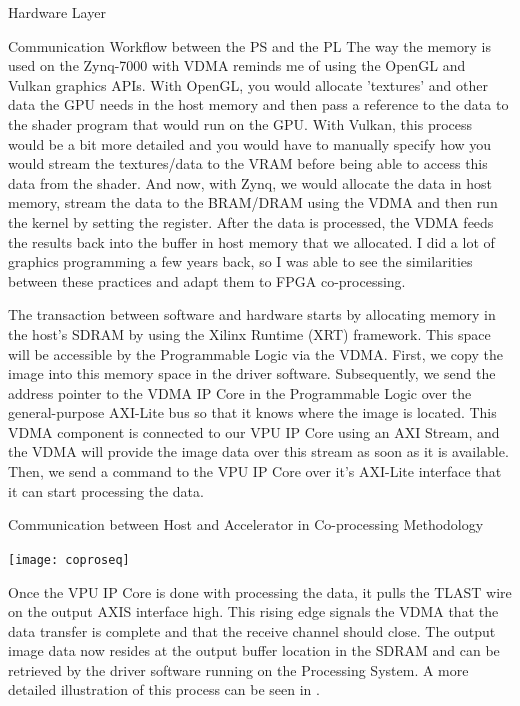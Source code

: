 \documentclass{matthijs}
\begin{document}
\begin{hoofdstuk}{Hardware Layer}
\begin{paragraaf}{Communication Workflow between the PS and the PL}
			The way the memory is used on the Zynq-7000 with VDMA reminds me of using the OpenGL and Vulkan graphics APIs.
			With OpenGL, you would allocate 'textures' and other data the GPU needs in the host memory and then pass a reference to the data to the shader program that would run on the GPU.
			With Vulkan, this process would be a bit more detailed and you would have to manually specify how you would stream the textures/data to the VRAM before being able to access this data from the shader.
			And now, with Zynq, we would allocate the data in host memory, stream the data to the BRAM/DRAM using the VDMA and then run the kernel by setting the register.
			After the data is processed, the VDMA feeds the results back into the buffer in host memory that we allocated.
			I did a lot of graphics programming a few years back, so I was able to see the similarities between these practices and adapt them to FPGA co-processing.
			
			\bigskip

			The transaction between software and hardware starts by allocating memory in the host's SDRAM by using the Xilinx Runtime (XRT) framework.
			This space will be accessible by the Programmable Logic via the VDMA.
			First, we copy the image into this memory space in the driver software.
			Subsequently, we send the address pointer to the VDMA IP Core in the Programmable Logic over the general-purpose AXI-Lite bus so that it knows where the image is located.
			This VDMA component is connected to our VPU IP Core using an AXI Stream, and the VDMA will provide the image data over this stream as soon as it is available.
			Then, we send a command to the VPU IP Core over it's AXI-Lite interface that it can start processing the data.

			\vspace{-0.6ex}
			\begin{figuur}{Communication between Host and Accelerator in Co-processing Methodology}
				\singlespacing
				\begin{adjustbox}{width=\textwidth,center}
					\texttt{[image: coproseq]}
				\end{adjustbox}
				\onehalfspacing
				\vspace{-3.9ex}
			\end{figuur}
			\vspace{-0.2ex}

			Once the VPU IP Core is done with processing the data, it pulls the TLAST wire on the output AXIS interface high.
			This rising edge signals the VDMA that the data transfer is complete and that the receive channel should close.
			The output image data now resides at the output buffer location in the SDRAM and can be retrieved by the driver software running on the Processing System.
			A more detailed illustration of this process can be seen in .


\end{paragraaf}
\end{hoofdstuk}
\end{document}
